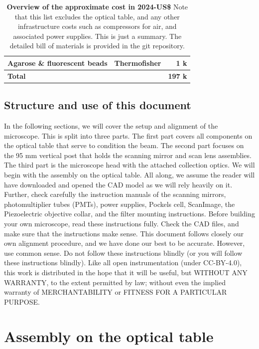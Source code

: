 \documentclass[10pt,letterpaper]{article}
\begin{document}
\begin{table}
\begin{center}
\begin{tabular}{ l c r }
                   Agarose \& fluorescent beads     & Thermofisher &  1 k \\
  \hline
 \textbf{Total}                    & & \textbf{197 k} \\
  \hline
  \end{tabular}
\end{center}
\caption{\textbf{Overview of the approximate cost in 2024-US\$} Note that this list excludes the optical table, and any other infrastructure costs such as compressors for air, and associated power supplies. This is just a summary. The detailed bill of materials is provided in the git repository.}\label{tab_costs}
\end{table}

\subsection{Structure and use of this document}
In the following sections, we will cover the setup and alignment of the microscope. This is split into three parts. The first part covers all components on the optical table that serve to condition the beam. The second part focuses on the  95 mm vertical post that holds the scanning mirror and scan lens assemblies. The third part is the microscope head with the attached collection optics. We will begin with the assembly on the optical table. All along, we assume the reader will have downloaded and opened the CAD model as we will rely heavily on it. Further, check carefully the instruction manuals of the scanning mirrors, photomultiplier tubes (PMTs), power supplies, Pockels cell, ScanImage, the Piezoelectric objective collar, and the filter mounting instructions.\newline
Before building your own microscope, read these instructions fully. Check the CAD files, and make sure that the instructions make sense. This document follows closely our own alignment procedure, and we have done our best to be accurate. However, use common sense. Do not follow these instructions blindly (or you will follow these instructions blindly). Like all open instrumentation (under CC-BY-4.0), this work is distributed in the hope that it will be useful, but WITHOUT ANY WARRANTY, to the extent permitted by law; without even the implied warranty of MERCHANTABILITY or FITNESS FOR A PARTICULAR PURPOSE. 

\section{Assembly on the optical table}
%
\end{document}
